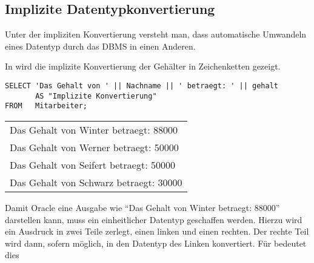 \subsection{Implizite Datentypkonvertierung}
\begin{merke}
    Unter der impliziten Konvertierung versteht man, dass automatische Umwandeln eines Datentyp durch das DBMS in einen Anderen.
\end{merke}
\clearpage
In  wird die implizite Konvertierung der Gehälter in Zeichenketten gezeigt.
\begin{lstlisting}[language=oracle_sql,caption={Implizite Konvertierung von \identifier{NUMBER} zu \identifier{VARCHAR2}},label=sql03_27]
SELECT 'Das Gehalt von ' || Nachname || ' betraegt: ' || gehalt
       AS "Implizite Konvertierung"
FROM   Mitarbeiter;
        \end{lstlisting}
\begin{center}
    \begin{small}
        \tablehead{}
        \begin{oraclesql}
            \begin{supertabular}{l}
                Das Gehalt von Winter betraegt: 88000 \\
                Das Gehalt von Werner betraegt: 50000 \\
                Das Gehalt von Seifert betraegt: 50000 \\
                Das Gehalt von Schwarz betraegt: 30000 \\
            \end{supertabular}
        \end{oraclesql}
    \end{small}
\end{center}
Damit Oracle eine Ausgabe wie \enquote{Das Gehalt von Winter betraegt:
    88000} darstellen kann, muss ein einheitlicher Datentyp geschaffen
werden. Hierzu wird ein Ausdruck in zwei Teile zerlegt, einen linken und
einen rechten. Der rechte Teil wird dann, sofern möglich, in den
Datentyp des Linken konvertiert. Für  bedeutet dies
